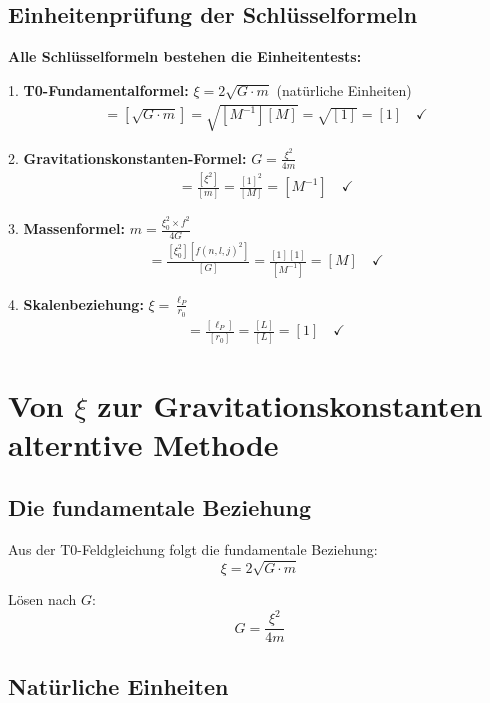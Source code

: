 \documentclass[12pt,a4paper]{article}
\newcommand{\xifunc}{f(n,l,j)}
\theoremstyle{definition}
\begin{document}
	\subsection{Einheitenprüfung der Schlüsselformeln}
	
	\textbf{Alle Schlüsselformeln bestehen die Einheitentests:}
	
	1. \textbf{T0-Fundamentalformel:} $\xi = 2\sqrt{G \cdot m}$ (natürliche Einheiten)
	\begin{align}
		[\xi] &= [\sqrt{G \cdot m}] = \sqrt{[M^{-1}][M]} = \sqrt{[1]} = [1] \quad \checkmark
	\end{align}
	
	2. \textbf{Gravitationskonstanten-Formel:} $G = \frac{\xi^2}{4m}$
	\begin{align}
		[G] &= \frac{[\xi^2]}{[m]} = \frac{[1]^2}{[M]} = [M^{-1}] \quad \checkmark
	\end{align}
	
	3. \textbf{Massenformel:} $m = \frac{\xi_0^2 \times f^2}{4G}$
	\begin{align}
		[m] &= \frac{[\xi_0^2][\xifunc^2]}{[G]} = \frac{[1][1]}{[M^{-1}]} = [M] \quad \checkmark
	\end{align}
	
	4. \textbf{Skalenbeziehung:} $\xi = \frac{\ell_P}{r_0}$
	\begin{align}
		[\xi] &= \frac{[\ell_P]}{[r_0]} = \frac{[L]}{[L]} = [1] \quad \checkmark
	\end{align}
	
	\section{Von $\xi$ zur Gravitationskonstanten alterntive Methode}
	
	\subsection{Die fundamentale Beziehung}
	
	Aus der T0-Feldgleichung folgt die fundamentale Beziehung:
	\begin{equation}
		\xi = 2\sqrt{G \cdot m}
	\end{equation}
	
	Lösen nach $G$:
	\begin{equation}
		\boxed{G = \frac{\xi^2}{4m}}
	\end{equation}
	
	\subsection{Natürliche Einheiten}
	
\end{document}
